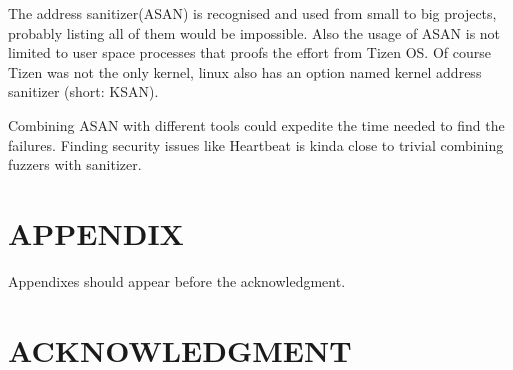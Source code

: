 \documentclass[letterpaper, 10 pt, conference]{IEEEtran}  %
\let\cite\parencite
\begin{document}
The address sanitizer(ASAN) is recognised and used from small to big projects, probably listing all of them would be impossible. Also the usage of ASAN is not limited to user space processes that proofs the effort from Tizen OS\cite{barinov2017applying}. Of course Tizen was not the only kernel, linux\cite{samsonov2013new} also has an option named kernel address sanitizer (short: KSAN).

Combining ASAN with different tools could expedite the time needed to find the failures. Finding security issues like Heartbeat\cite{alkazimi2016heartbleed} is kinda close to trivial combining fuzzers\cite{bohme2017directed} with sanitizer.


\addtolength{\textheight}{-12cm}   %







\section*{APPENDIX}

Appendixes should appear before the acknowledgment.

\section*{ACKNOWLEDGMENT}




\printbibliography
\end{document}
